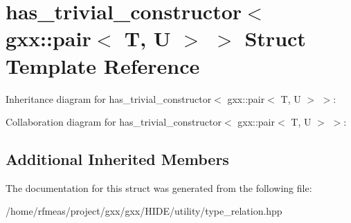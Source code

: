\hypertarget{structhas__trivial__constructor_3_01gxx_1_1pair_3_01T_00_01U_01_4_01_4}{}\section{has\+\_\+trivial\+\_\+constructor$<$ gxx\+:\+:pair$<$ T, U $>$ $>$ Struct Template Reference}
\label{structhas__trivial__constructor_3_01gxx_1_1pair_3_01T_00_01U_01_4_01_4}


Inheritance diagram for has\+\_\+trivial\+\_\+constructor$<$ gxx\+:\+:pair$<$ T, U $>$ $>$\+:


Collaboration diagram for has\+\_\+trivial\+\_\+constructor$<$ gxx\+:\+:pair$<$ T, U $>$ $>$\+:
\subsection*{Additional Inherited Members}


The documentation for this struct was generated from the following file\+:\begin{DoxyCompactItemize}
\item 
/home/rfmeas/project/gxx/gxx/\+H\+I\+D\+E/utility/type\+\_\+relation.\+hpp\end{DoxyCompactItemize}

